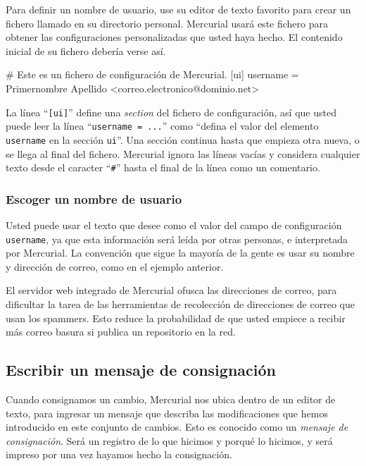 Para definir un nombre de usuario, use su editor de texto favorito
para crear un fichero llamado  en su directorio
personal. Mercurial usará este fichero para obtener las
configuraciones personalizadas que usted haya hecho. El contenido
inicial de su fichero  debería verse así.
\begin{codesample2}
  # Este es un fichero de configuración de Mercurial.
  [ui]
  username = Primernombre Apellido <correo.electronico@dominio.net>
\end{codesample2}
La línea ``\texttt{[ui]}'' define una \emph{section} del fichero de
configuración, así que usted puede leer la línea ``\texttt{username =
...}'' como ``defina el valor del elemento \texttt{username} en la
sección \texttt{ui}''.
Una sección continua hasta que empieza otra nueva, o se llega al final
del fichero. Mercurial ignora las líneas vacías y considera cualquier
texto desde el caracter ``\texttt{\#}'' hasta el final de la línea
como un comentario.

\subsubsection{Escoger un nombre de usuario}

Usted puede usar el texto que desee como el valor del campo de
configuración \texttt{username}, ya que esta información será leída
por otras personas, e interpretada por Mercurial. La convención que
sigue la mayoría de la gente es usar su nombre y dirección de correo,
como en el ejemplo anterior.

\begin{note}
    El servidor web integrado de Mercurial ofusca las direcciones de
    correo, para dificultar la tarea de las herramientas de
    recolección de direcciones de correo que usan los
    spammers. Esto reduce la probabilidad de que
    usted empiece a recibir más correo basura si publica un
    repositorio en la red.
\end{note}

\subsection{Escribir un mensaje de consignación}

Cuando consignamos un cambio, Mercurial nos ubica dentro de un editor
de texto, para ingresar un mensaje que describa las modificaciones que
hemos introducido en este conjunto de cambios. Esto es conocido como
un \emph{mensaje de consignación}. Será un registro de lo que hicimos
y porqué lo hicimos, y será impreso por  una vez hayamos
hecho la consignación.

